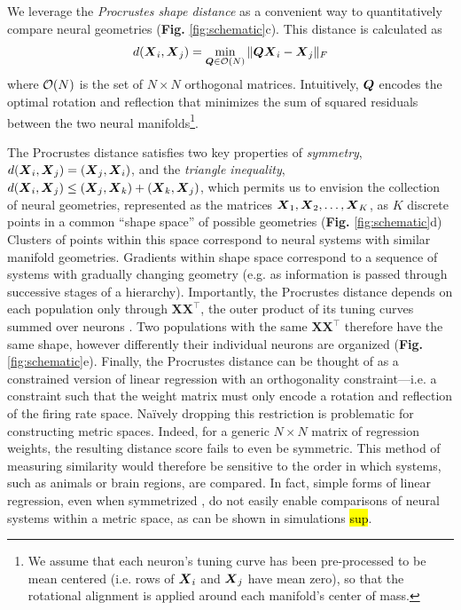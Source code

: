 We leverage the \textit{Procrustes shape distance} \parencite{schonemann1966generalized} as a convenient way to quantitatively compare neural geometries (\textbf{Fig.} \ref{fig:schematic}c).
This distance is calculated as
\begin{equation}
\label{eq:procrustes-distance}
d(\boldsymbol{X}_i, \boldsymbol{X}_j) = \min_{\boldsymbol{Q} \in \mathcal{O}(N)} \Vert \boldsymbol{Q} \boldsymbol{X}_i - \boldsymbol{X}_j \Vert_F
\end{equation}
where $\mathcal{O}(N)$ is the set of $N \times N$ orthogonal matrices.
Intuitively, $\boldsymbol{Q}$ encodes the optimal rotation and reflection that minimizes the sum of squared residuals between the two neural manifolds\footnote{We assume that each neuron's tuning curve has been pre-processed to be mean centered (i.e. rows of $\boldsymbol{X}_i$ and $\boldsymbol{X}_j$ have mean zero), so that the rotational alignment is applied around each manifold's center of mass.}. 

The Procrustes distance satisfies two key properties of \textit{symmetry}, $d(\boldsymbol{X}_i, \boldsymbol{X}_j) = (\boldsymbol{X}_j, \boldsymbol{X}_i)$, and the \textit{triangle inequality}, $d(\boldsymbol{X}_i, \boldsymbol{X}_j) \leq (\boldsymbol{X}_j, \boldsymbol{X}_k) + (\boldsymbol{X}_k, \boldsymbol{X}_j)$, which permits us to envision the collection of neural geometries, represented as the matrices $\boldsymbol{X}_1, \boldsymbol{X}_2, \dots, \boldsymbol{X}_K$, as $K$ discrete points in a common ``shape space'' of possible geometries (\textbf{Fig.} \ref{fig:schematic}d)
Clusters of points within this space correspond to neural systems with similar manifold geometries.
Gradients within shape space correspond to a sequence of systems with gradually changing geometry (e.g. as information is passed through successive stages of a hierarchy). Importantly, the Procrustes distance depends on each population only through $\mathbf{X}\mathbf{X}^\top$, the outer product of its tuning curves summed over neurons \parencite{harvey2024duality}. Two populations with the same $\mathbf{X}\mathbf{X}^\top$ therefore have the same shape, however differently their individual neurons are organized (\textbf{Fig.} \ref{fig:schematic}e). Finally, the Procrustes distance can be thought of as a constrained version of linear regression with an orthogonality constraint---i.e. a constraint such that the weight matrix must only encode a rotation and reflection of the firing rate space. Na\"ively dropping this restriction is problematic for constructing metric spaces. Indeed, for a generic $N \times N$ matrix of regression weights, the resulting distance score fails to even be symmetric. This method of measuring similarity would therefore be sensitive to the order in which systems, such as animals or brain regions, are compared. In fact, simple forms of linear regression, even when symmetrized \parencite{muzellec2026reverse}, do not easily enable comparisons of neural systems within a metric space, as can be shown in simulations \hl{sup}.

